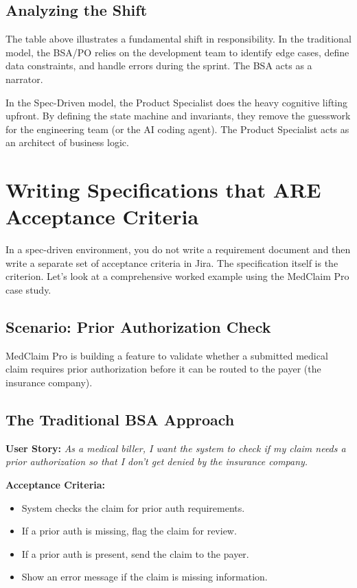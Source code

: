 \documentclass[
  11pt,
  openany,
  oneside]{book}
\providecommand{\tightlist}{%
  \setlength{\itemsep}{0pt}\setlength{\parskip}{0pt}}
\begin{document}
\subsection{Analyzing the Shift}\label{analyzing-the-shift}

The table above illustrates a fundamental shift in responsibility. In
the traditional model, the BSA/PO relies on the development team to
identify edge cases, define data constraints, and handle errors during
the sprint. The BSA acts as a narrator.

In the Spec-Driven model, the Product Specialist does the heavy
cognitive lifting upfront. By defining the state machine and invariants,
they remove the guesswork for the engineering team (or the AI coding
agent). The Product Specialist acts as an architect of business logic.

\section{Writing Specifications that ARE Acceptance
Criteria}\label{writing-specifications-that-are-acceptance-criteria}

In a spec-driven environment, you do not write a requirement document
and then write a separate set of acceptance criteria in Jira. The
specification itself is the criterion. Let's look at a comprehensive
worked example using the MedClaim Pro case study.

\subsection{Scenario: Prior Authorization
Check}\label{scenario-prior-authorization-check}

MedClaim Pro is building a feature to validate whether a submitted
medical claim requires prior authorization before it can be routed to
the payer (the insurance company).

\subsection{The Traditional BSA
Approach}\label{the-traditional-bsa-approach}

\textbf{User Story:} \emph{As a medical biller, I want the system to
check if my claim needs a prior authorization so that I don't get denied
by the insurance company.}

\textbf{Acceptance Criteria:}

\begin{itemize}
\tightlist
\item
  System checks the claim for prior auth requirements.
\item
  If a prior auth is missing, flag the claim for review.
\item
  If a prior auth is present, send the claim to the payer.
\item
  Show an error message if the claim is missing information.
\end{itemize}
\end{document}
